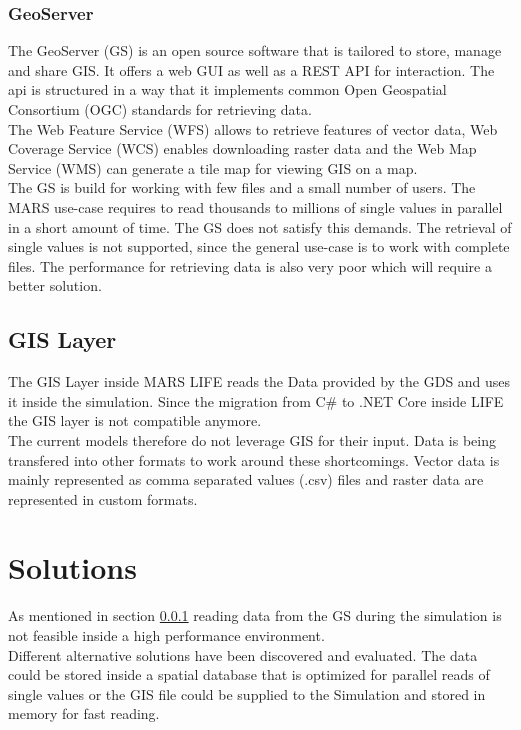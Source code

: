 \subsubsection{GeoServer} \label{sec:GS}
The GeoServer (GS) is an open source software that is tailored to store, manage and share GIS. It offers a web GUI as well as a REST API for interaction. The api is structured in a way that it implements common Open Geospatial Consortium (OGC) standards for retrieving data.\\
The Web Feature Service (WFS) allows to retrieve features of vector data, Web Coverage Service (WCS) enables downloading raster data and the Web Map Service (WMS) can generate a tile map for viewing GIS on a map.\\
The GS is build for working with few files and a small number of users. The MARS use-case requires to read thousands to millions of  single values in parallel in a short amount of time. The GS does not satisfy this demands. The retrieval of single values is not supported, since the general use-case is to work with complete files. The performance for retrieving data is also very poor which will require a better solution.


\subsection{GIS Layer}
The GIS Layer inside MARS LIFE reads the Data provided by the GDS and uses it inside the simulation. Since the migration from C\# to .NET Core inside LIFE the GIS layer is not compatible anymore.\\
The current models therefore do not leverage GIS for their input. Data is being transfered into other formats to work around these shortcomings. Vector data is mainly represented as comma separated values (.csv) files and raster data are represented in custom formats.


\section{Solutions}
As mentioned in section \ref{sec:GS} reading data from the GS during the simulation is not feasible inside a high performance environment.\\
Different alternative solutions have been discovered and evaluated. The data could be stored inside a spatial database that is optimized for parallel reads of single values or the GIS file could be supplied to the Simulation and stored in memory for fast reading.

